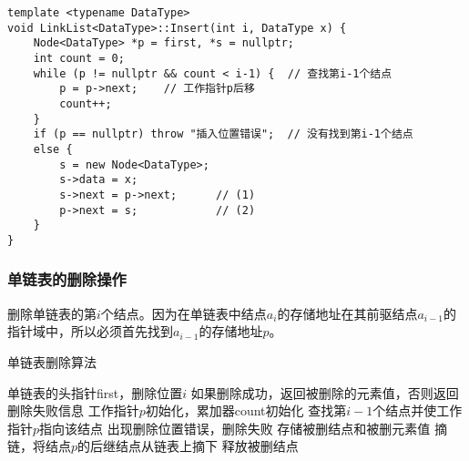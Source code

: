 \documentclass[12pt,a4paper]{amsart}
\begin{document}
\begin{center}
\end{center}

\begin{lstlisting}[caption=单链表插入操作实现]
template <typename DataType>
void LinkList<DataType>::Insert(int i, DataType x) {
    Node<DataType> *p = first, *s = nullptr;
    int count = 0;
    while (p != nullptr && count < i-1) {  // 查找第i-1个结点
        p = p->next;    // 工作指针p后移
        count++;
    }
    if (p == nullptr) throw "插入位置错误";  // 没有找到第i-1个结点
    else {
        s = new Node<DataType>;
        s->data = x;
        s->next = p->next;      // (1)
        p->next = s;            // (2)
    }
}
\end{lstlisting}

\subsubsection{单链表的删除操作}

删除单链表的第$i$个结点。因为在单链表中结点$a_i$的存储地址在其前驱结点$a_{i-1}$的指针域中，所以必须首先找到$a_{i-1}$的存储地址$p$。

\begin{algorithm}[H]
\caption{单链表删除算法}
\begin{algorithmic}[1]
\REQUIRE 单链表的头指针first，删除位置$i$
\ENSURE 如果删除成功，返回被删除的元素值，否则返回删除失败信息
\STATE 工作指针$p$初始化，累加器count初始化
\STATE 查找第$i-1$个结点并使工作指针$p$指向该结点
    \STATE 出现删除位置错误，删除失败
\ELSE
    \STATE 存储被删结点和被删元素值
    \STATE 摘链，将结点$p$的后继结点从链表上摘下
    \STATE 释放被删结点
\ENDIF
\end{algorithmic}
\end{algorithm}
\end{document}
